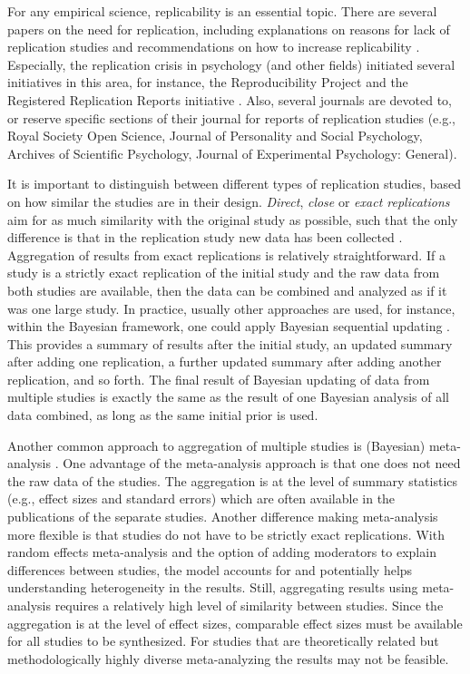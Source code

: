 \documentclass[11pt,reqno]{article}
\begin{document}
For any empirical science, replicability is an essential topic. There are several papers on the need for replication, including explanations on reasons for lack of replication studies and recommendations on how to increase replicability \autocite{asendorpf_replication_2013, simonsohn_telescopes_2015, verhagen_bayesian_2014, nosek_replicability_review_2021}.
Especially, the replication crisis in psychology (and other fields) initiated several initiatives in this area, for instance, the Reproducibility Project \autocite{open_science_collab_2015, open_science_collab_2012} and the Registered Replication Reports initiative \autocite{simons_registered_2014}. Also, several journals are devoted to, or reserve specific sections of their journal for reports of replication studies (e.g., Royal Society Open Science, Journal of Personality and Social Psychology, Archives of Scientific Psychology, Journal of Experimental Psychology: General).

It is important to distinguish between different types of replication studies, based on how similar the studies are in their design. \textit{Direct}, \textit{close} or \textit{exact replications} aim for as much similarity with the original study as possible, such that the only difference is that in the replication study new data has been collected \autocite{simons_direct_2014, brandt_et_al_replication_2014}. Aggregation of results from exact replications is relatively straightforward. If a study is a strictly exact replication of the initial study and the raw data from both studies are available, then the data can be combined and analyzed as if it was one large study. In practice, usually other approaches are used, for instance, within the Bayesian framework, one could apply Bayesian sequential updating \autocite{schonbrodt_sequential_2017}. This provides a summary of results after the initial study, an updated summary after adding one replication, a further updated summary after adding another replication, and so forth. The final result of Bayesian updating of data from multiple studies is exactly the same as the result of one Bayesian analysis of all data combined, as long as the same initial prior is used.

Another common approach to aggregation of multiple studies is (Bayesian) meta-analysis \autocite[see][]{lipsey_wilson_2001, sutton_bayesian_meta2001}. One advantage of the meta-analysis approach is that one does not need the raw data of the studies. The aggregation is at the level of summary statistics (e.g., effect sizes and standard errors) which are often available in the publications of the separate studies. Another difference making meta-analysis more flexible is that studies do not have to be strictly exact replications. With random effects meta-analysis and the option of adding moderators to explain differences between studies, the model accounts for and potentially helps understanding heterogeneity in the results. Still, aggregating results using meta-analysis requires a relatively high level of similarity between studies. Since the aggregation is at the level of effect sizes, comparable effect sizes must be available for all studies to be synthesized. For studies that are theoretically related but methodologically highly diverse meta-analyzing the results may not be feasible.
\end{document}
